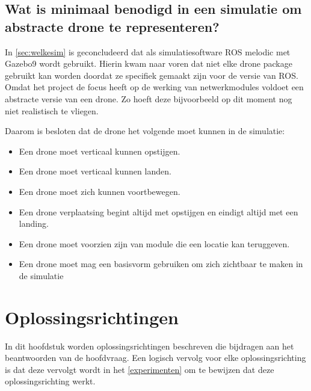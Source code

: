 \documentclass[a4paper, 11pt, oneside]{report}
\begin{document}
 


\section{Wat is minimaal benodigd in een simulatie om abstracte drone te representeren?}
\label{sec:dronekeuze}

In \autoref{sec:welkesim} is geconcludeerd dat als simulatiesoftware ROS melodic met Gazebo9 wordt gebruikt.
Hierin kwam naar voren dat niet elke drone package gebruikt kan worden doordat ze specifiek gemaakt zijn voor de versie van ROS.
Omdat het project de focus heeft op de werking van netwerkmodules voldoet een abstracte versie van een drone.
Zo hoeft deze bijvoorbeeld op dit moment nog niet realistisch te vliegen.

Daarom is besloten dat de drone het volgende moet kunnen in de simulatie:

\begin{itemize}
	\item Een drone moet verticaal kunnen opstijgen.
	\item Een drone moet verticaal kunnen landen.
	\item Een drone moet zich kunnen voortbewegen.
	\item Een drone verplaatsing begint altijd met opstijgen en eindigt altijd met een landing.
	\item Een drone moet voorzien zijn van module die een locatie kan teruggeven. 
	\item Een drone moet mag een basisvorm gebruiken om zich zichtbaar te maken in de simulatie
\end{itemize}


\chapter{Oplossingsrichtingen}



In dit hoofdstuk worden oplossingsrichtingen beschreven die bijdragen aan het beantwoorden van de hoofdvraag. 
Een logisch vervolg voor elke oplossingsrichting is dat deze vervolgt wordt in het \autoref{experimenten}  om te bewijzen dat deze oplossingsrichting werkt.
\end{document}
